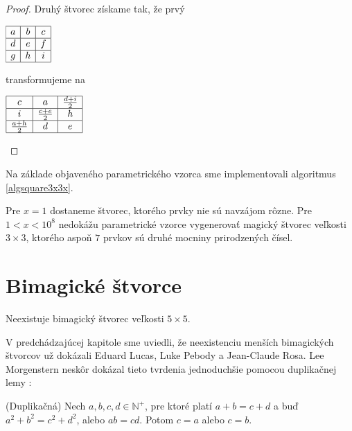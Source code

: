 \begin{proof}
Druhý štvorec získame tak, že prvý

\begin{center}
$\begin{array}{ |c|c|c| } 
\hline
a & b & c \\ 
\hline
d & e & f \\ 
\hline
g & h & i \\
\hline
\end{array}$
\end{center}

transformujeme na

\begin{center}
$\begin{array}{ |c|c|c| } 
\hline
c & a & \frac{d+i}{2} \\ 
\hline
i & \frac{c+e}{2} & h \\ 
\hline
\frac{a+h}{2} & d & e \\
\hline
\end{array}$
\end{center}

\end{proof}

Na základe objaveného parametrického vzorca sme implementovali algoritmus \ref{algsquare3x3x}.

\begin{result} Pre $x = 1$ dostaneme štvorec, ktorého prvky nie sú navzájom rôzne. Pre $1 < x < 10^8$ nedokážu parametrické vzorce vygenerovať magický štvorec veľkosti $3 \times 3$, ktorého aspoň $7$ prvkov sú druhé mocniny prirodzených čísel.
\end{result}

\section{Bimagické štvorce}

\begin{hypothesis} Neexistuje bimagický štvorec veľkosti $5 \times 5$.
\end{hypothesis}

V predchádzajúcej kapitole sme uviedli, že neexistenciu menších bimagických štvorcov už dokázali Eduard Lucas, Luke Pebody a Jean-Claude Rosa. Lee Morgenstern neskôr dokázal tieto tvrdenia jednoduchšie pomocou duplikačnej lemy \cite{multimagie}:

\begin{lemma} (Duplikačná) Nech $a,b,c,d \in \mathbb{N^+}$, pre ktoré platí $a + b = c + d$ a buď $a^2 + b^2 = c^2 + d^2$, alebo $ab = cd$. Potom $c = a$ alebo $c = b$.
\end{lemma}
 
